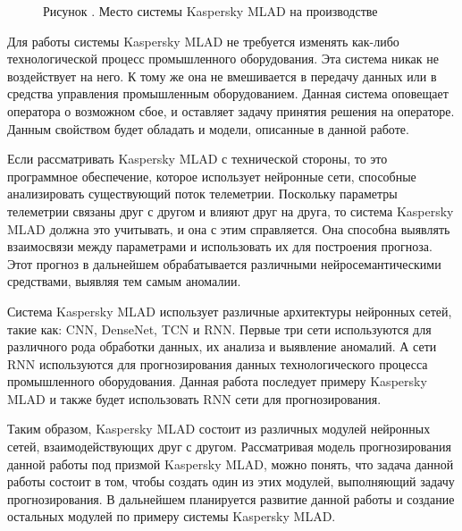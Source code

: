 {  \begin{figure}[H]
    \centering
    \def\svgwidth{\textwidth}
    
    \caption*{\gostFont Рисунок \thechaptercntr .\theimagecntr \spc {--} Место системы Kaspersky MLAD на производстве}
    \label{fig:MLADBlackBox}
  \end{figure} \addtocounter{imagecntr}{1}

  \par \redline Для работы системы Kaspersky MLAD не требуется изменять как-либо технологической процесс промышленного оборудования. Эта система никак не воздействует на него. К тому же она не вмешивается в передачу данных или в средства управления промышленным оборудованием. Данная система оповещает оператора о возможном сбое, и оставляет задачу принятия решения на операторе. Данным свойством будет обладать и модели, описанные в данной работе.

  \par \redline Если рассматривать Kaspersky MLAD с технической стороны, то это программное обеспечение, которое использует нейронные сети, способные анализировать существующий поток телеметрии. Поскольку параметры телеметрии связаны друг с другом и влияют друг на друга, то система Kaspersky MLAD должна это учитывать, и она с этим справляется. Она способна выявлять взаимосвязи между параметрами и использовать их для построения прогноза. Этот прогноз в дальнейшем обрабатывается различными нейросемантическими средствами, выявляя тем самым аномалии.

  \par \redline Система Kaspersky MLAD использует различные архитектуры нейронных сетей, такие как: CNN, DenseNet, TCN и RNN. Первые три сети используются для различного рода обработки данных, их анализа и выявление аномалий. А сети RNN используются для прогнозирования данных технологического процесса промышленного оборудования. Данная работа последует примеру Kaspersky MLAD и также будет использовать RNN сети для прогнозирования.

  \par \redline Таким образом, Kaspersky MLAD состоит из различных модулей нейронных сетей, взаимодействующих друг с другом. Рассматривая модель прогнозирования данной работы под призмой Kaspersky MLAD, можно понять, что задача данной работы состоит в том, чтобы создать один из этих модулей, выполняющий задачу прогнозирования. В дальнейшем планируется развитие данной работы и создание остальных модулей по примеру системы Kaspersky MLAD.

}
